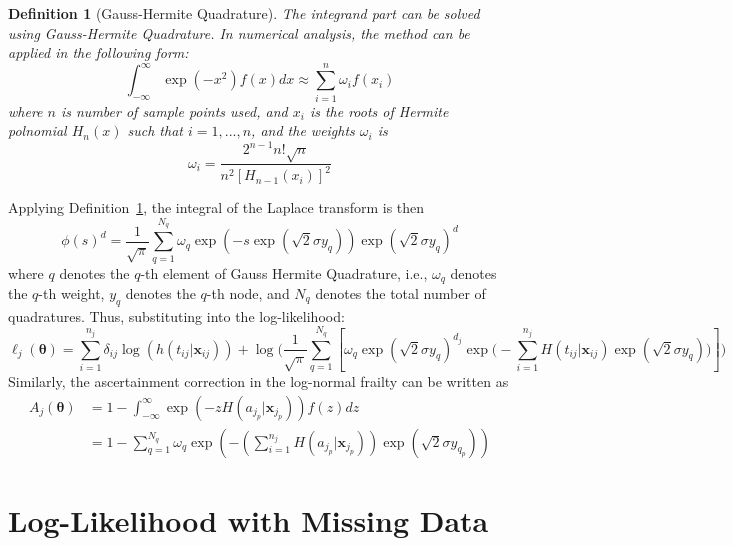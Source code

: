 \documentclass[preprint,12pt]{elsarticle}
\newtheorem{defn}{Definition}
\begin{document}
\begin{defn}[Gauss-Hermite Quadrature]\label{defn:gausshermite}
    The integrand part can be solved using Gauss-Hermite Quadrature. In numerical analysis, the method can be applied in the following form:
\begin{equation}
    \int_{-\infty}^{\infty}\exp(-x^2)f(x)dx\approx \sum_{i=1}^n\omega_i f(x_i)
\end{equation}
where $n$ is number of sample points used, and $x_i$ is the roots of Hermite polnomial $H_n (x)$ such that $i=1, ..., n$, and the weights $\omega_i$ is 
\begin{equation}
    \omega_i=\frac{2^{n-1}n!\sqrt{n}}{n^2[H_{n-1}(x_i)]^2}
\end{equation}
\end{defn}

\noindent
Applying Definition~\ref{defn:gausshermite}, the integral of the Laplace transform is then
\begin{equation}
    \phi(s)^d=\frac{1}{\sqrt{\pi}}\sum_{q=1}^{N_{q}}\omega_{q}\exp(-s\exp(\sqrt{2}\sigma y_{q}))\exp(\sqrt{2}\sigma y_{q})^d
\end{equation}
where $q$ denotes the $q$-th element of Gauss Hermite Quadrature, i.e., $\omega_{q}$ denotes the $q$-th weight, $y_{q}$ denotes the $q$-th node, and $N_{q}$ denotes the total number of quadratures. Thus, substituting into the log-likelihood:
\begin{equation}
    \ell_j(\boldsymbol{\theta})=\sum_{i=1}^{n_j}\delta_{ij}\log(h(t_{ij}|\mathbf{x}_{ij}))+\log\Big (\frac{1}{\sqrt{\pi}}\sum_{q=1}^{N_{q}}\left [\omega_{q}\exp(\sqrt{2}\sigma y_{q})^{d_j}\exp\Big (-\sum_{i=1}^{n_j}H(t_{ij}|\mathbf{x}_{ij})\exp(\sqrt{2}\sigma y_{q})\Big )\right ]\Big )
\end{equation}
Similarly, the ascertainment correction in the log-normal frailty can be written as 
\begin{align}
    A_j(\boldsymbol{\theta})&=1-\int_{-\infty}^{\infty} \exp(-z H(a_{j_p}|\mathbf{x}_{j_p}))f(z)dz\\
    &=1-\sum_{q=1}^{N_{q}}\omega_{q} \exp\left (-(\sum_{i=1}^{n_j} H(a_{j_p}|\mathbf{x}_{j_p}))\exp (\sqrt{2}\sigma y_{q_p})\right )
\end{align}

\section{Log-Likelihood with Missing Data}
\end{document}
